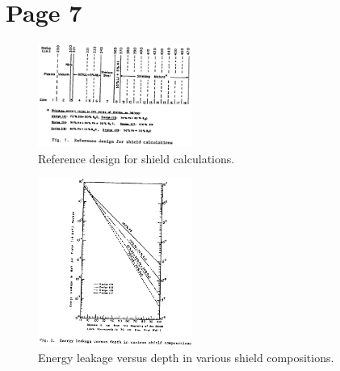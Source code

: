 \documentclass[11pt]{report} %
\begin{document}
\section{Page 7}
\begin{figure}[H]
  \centering
  \includegraphics[width=0.45\textwidth]{figs/shield.png}
  \caption{Reference design for shield calculations.}
\end{figure}

\begin{figure}[H]
  \centering
  \includegraphics[width=0.45\textwidth]{figs/energyLeakage.png}
  \caption{Energy leakage versus depth in various shield compositions.}
\end{figure}
\end{document}
